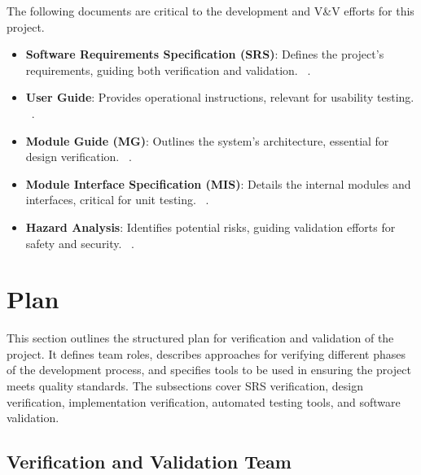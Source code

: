 \documentclass[12pt, titlepage]{article}
\begin{document}



The following documents are critical to the development and V\&V efforts for this project.

\begin{itemize}
    \item \textbf{Software Requirements Specification (SRS)}: Defines the project’s requirements, guiding both verification and validation. ~\citep{SRS}.
    \item \textbf{User Guide}: Provides operational instructions, relevant for usability testing. ~\citep{UserGuide}.
    \item \textbf{Module Guide (MG)}: Outlines the system’s architecture, essential for design verification. ~\citep{MG}.
    \item \textbf{Module Interface Specification (MIS)}: Details the internal modules and interfaces, critical for unit testing. ~\citep{MIS}.
    \item \textbf{Hazard Analysis}: Identifies potential risks, guiding validation efforts for safety and security. ~\citep{HazardAnalysis}.
\end{itemize}

\section{Plan}

This section outlines the structured plan for verification and validation of the project. It defines team roles, describes approaches for verifying different phases of the development process, and specifies tools to be used in ensuring the project meets quality standards. The subsections cover SRS verification, design verification, implementation verification, automated testing tools, and software validation.

\subsection{Verification and Validation Team}
\end{document}
